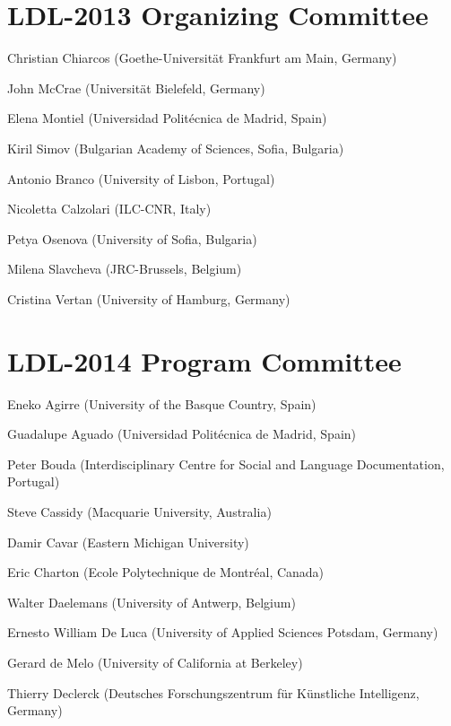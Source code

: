 \documentclass[10pt, a4paper]{article}
\begin{document}
\begin{figure*}[t]
\begin{minipage}{\textwidth}
\section*{LDL-2013 Organizing Committee}

\smallskip

Christian Chiarcos (Goethe-Universität Frankfurt am Main, Germany)

John McCrae (Universität Bielefeld, Germany)

Elena Montiel (Universidad Politécnica de Madrid, Spain)

Kiril Simov (Bulgarian Academy of Sciences, Sofia, Bulgaria)

Antonio Branco (University of Lisbon, Portugal)

Nicoletta Calzolari (ILC-CNR, Italy)

Petya Osenova (University of Sofia, Bulgaria)

Milena Slavcheva (JRC-Brussels, Belgium)

Cristina Vertan (University of Hamburg, Germany)

\bigskip

\section*{LDL-2014 Program Committee}

\smallskip


Eneko Agirre (University of the Basque Country, Spain)

Guadalupe Aguado (Universidad Politécnica de Madrid, Spain)

Peter Bouda (Interdisciplinary Centre for Social and Language Documentation, Portugal)

Steve Cassidy (Macquarie University, Australia)

Damir Cavar (Eastern Michigan University)

Eric Charton (Ecole Polytechnique de Montréal, Canada)

Walter Daelemans (University of Antwerp, Belgium)

Ernesto William De Luca (University of Applied Sciences Potsdam, Germany)

Gerard de Melo (University of California at Berkeley)

Thierry Declerck (Deutsches Forschungszentrum für Künstliche Intelligenz, Germany)


\end{minipage}
\end{figure*}
\end{document}

